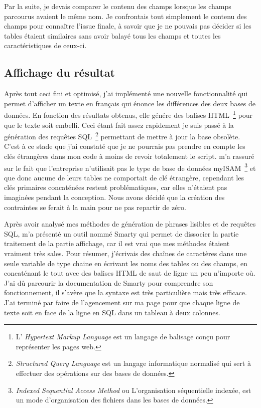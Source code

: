 Par la suite, je devais comparer le contenu des champs lorsque les
champs parcourus avaient le même nom. Je confrontais tout simplement le
contenu des champs pour connaître l'issue finale, à savoir que je ne
pouvais pas décider si les tables étaient similaires sans avoir balayé
tous les champs et toutes les caractéristiques de ceux-ci.

\subsection{Affichage du résultat} %
\label{sub:Affichage du résultat}

Après tout ceci fini et optimisé, j'ai implémenté une nouvelle
fonctionnalité qui permet d'afficher un texte en français qui énonce les
différences des deux bases de données. En fonction des résultats
obtenus, elle génére des balises HTML\, \footnote{L’ \emph{Hypertext
Markup Language} est un langage de balisage conçu pour représenter les
pages web.} pour que le texte soit embelli. Ceci étant fait assez
rapidement je suis passé à la génération des requêtes SQL\,
\footnote{\emph{Structured Query Language} est un langage informatique
normalisé qui sert à effectuer des opérations sur des bases de données.}
permettant de mettre à jour la base obsolète. C'est à ce stade que j'ai
constaté que je ne pourrais pas prendre en compte les clés étrangères
dans mon code à moins de revoir totalement le script.  
m'a rassuré sur le fait que l'entreprise n'utilisait pas le type de base
de données myISAM\, \footnote{\emph{Indexed Sequential Access Method} ou
L'organisation séquentielle indexée, est un mode d'organisation des
fichiers dans les bases de données.} et que donc aucune de leurs tables
ne comportait de clé étrangère, cependant les clés primaires concaténées
restent problématiques, car elles n'étaient pas imaginées pendant la
conception. Nous avons décidé que la création des contraintes se ferait
à la main pour ne pas repartir de zéro.

Après avoir analysé mes méthodes de génération de phrases lisibles et de
requêtes SQL,  m'a présenté un outil nommé \og Smarty
\fg{} qui permet de dissocier la partie traitement de la partie
affichage, car il est vrai que mes méthodes étaient vraiment très sales.
Pour résumer, j'écrivais des chaînes de caractères dans une seule
variable de type chaine en écrivant les noms des tables ou des champs,
en concaténant le tout avec des balises HTML de saut de ligne un peu
n'importe où. J'ai dû parcourir la documentation de Smarty pour
comprendre son fonctionnement, il s'avère que la syntaxe est très
particulière mais très efficace. J'ai terminé par faire de l'agencement
sur ma page pour que chaque ligne de texte soit en face de la ligne
en SQL dans un tableau à deux colonnes.\\

